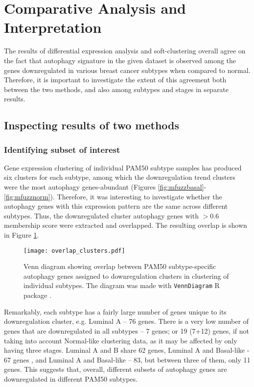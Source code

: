 \section{Comparative Analysis and Interpretation}

The results of differential expression analysis and soft-clustering overall agree on the fact that autophagy signature in the given dataset is observed among the genes downregulated in various breast cancer subtypes when compared to normal. Therefore, it is important to investigate the extent of this agreement both between the two methods, and also among subtypes and stages in separate results. 

\subsection{Inspecting results of two methods}

\subsubsection{Identifying subset of interest}

Gene expression clustering of individual PAM50 subtype samples has produced six clusters for each subtype, among which the downregulation trend clusters were the most autophagy genes-abundant (Figures \ref{fig:mfuzzbasal}-\ref{fig:mfuzznorm}). Therefore, it was interesting to investigate whether the autophagy genes with this expression pattern are the same across different subtypes. Thus, the downregulated cluster autophagy genes with $>0.6$ membership score were extracted and overlapped. The resulting overlap is shown in Figure \ref{fig:overlapclusters}. \\

            \begin{figure}[!h]
            \centering
            \texttt{[image: overlap\_clusters.pdf]} 
            \caption[Overlap between PAM50 subtype-specific downregulation cluster autophagy genes]{Venn diagram showing overlap between PAM50 subtype-specific autophagy genes assigned to downregulation clusters in clustering of individual subtypes. The diagram was made with \texttt{VennDiagram} R package \cite{venndiagram}. }
            \label{fig:overlapclusters}
            \end{figure}
            
Remarkably, each subtype has a fairly large number of  genes unique to its downregulation cluster, e.g. Luminal A -- 76 genes. There is a very low number of genes that are downregulated in all subtypes -- 7 genes; or 19 (7+12) genes, if not taking into account Normal-like clustering data, as it may be affected by only having three stages. Luminal A and B share 62 genes, Luminal A and Basal-like - 67 genes , and Luminal A and Basal-like -- 83, but between three of them, only 11 genes. This suggests that, overall, different subsets of autophagy genes are downregulated in different PAM50 subtypes. 




